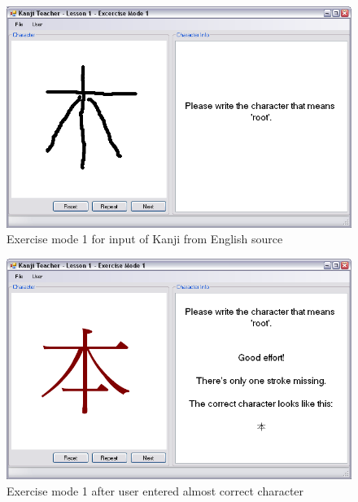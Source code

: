 \begin{figure}[htbp]
\begin{center}
\includegraphics[scale=0.6]{images/ConceptualDesign/exerciseMode1.png}
\caption{Exercise mode 1 for input of Kanji from English source}
\label{fig:exerciseMode1}
\end{center}
\end{figure}

\begin{figure}[htbp]
\begin{center}
\includegraphics[scale=0.6]{images/ConceptualDesign/exerciseMode1Errormessage.png}
\caption{Exercise mode 1 after user entered almost correct character}
\label{fig:exerciseMode1Errormessage}
\end{center}
\end{figure}


